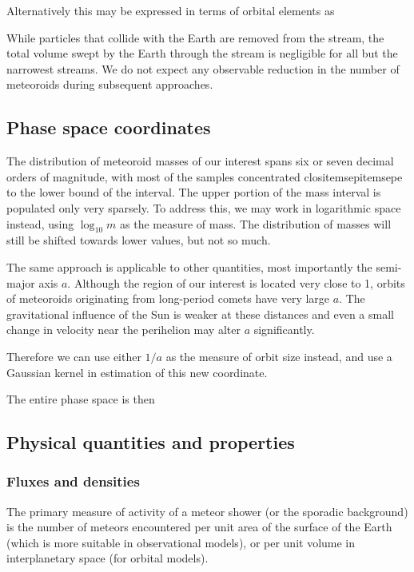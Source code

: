         Alternatively this may be expressed in terms of orbital elements as

        While particles that collide with the Earth are removed from the stream,
        the total volume swept by the Earth through the stream is negligible for all but the narrowest streams.
        We do not expect any observable reduction in the number of meteoroids during subsequent approaches.

        \subsection{Phase space coordinates} \label{modc}
            The distribution of meteoroid masses of our interest spans six or seven decimal orders of magnitude,
            with most of the samples concentrated clositemsepitemsepe to the lower bound of the interval.
            The upper portion of the mass interval is populated only very sparsely.
            To address this, we may work in logarithmic space instead, using $\log_{10} m$ as the measure of mass.
            The distribution of masses will still be shifted towards lower values, but not so much.

            The same approach is applicable to other quantities, most importantly the semi-major axis $a$.
            Although the region of our interest is located very close to \SI{1}{\au},
            orbits of meteoroids originating from long-period comets have very large $a$.
            The gravitational influence of the Sun is weaker at these distances and
            even a small change in velocity near the perihelion may alter $a$ significantly.

            Therefore we can use either $1/a$ as the measure of orbit size instead,
            and use a Gaussian kernel in estimation of this new coordinate.

            The entire phase space is then

    \subsection{Physical quantities and properties} \label{mp}
        \subsubsection{Fluxes and densities} \label{msmf}
            The primary measure of activity of a meteor shower (or the sporadic background) is the number
            of meteors encountered per unit area of the surface of the Earth (which is more suitable
            in observational models), or per unit volume in interplanetary space (for orbital models).

